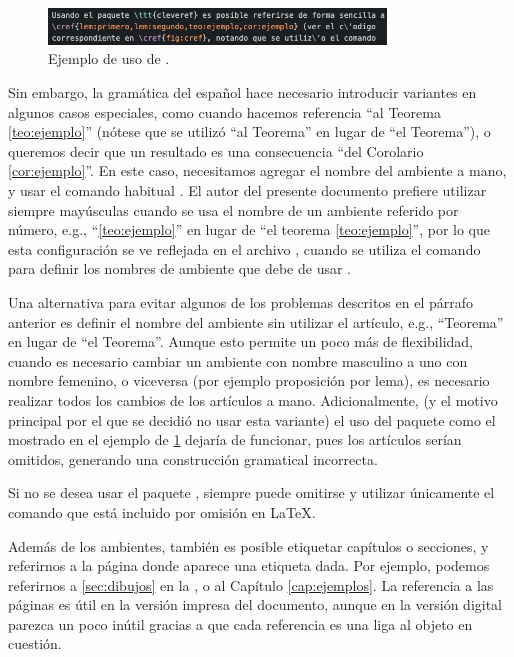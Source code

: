 \begin{figure}[H]
  \centering
  \includegraphics[width=0.8\textwidth]{recursos/capturas/cref}
  \caption{Ejemplo de uso de .}
  \label{fig:cref}
\end{figure}

Sin embargo, la gram\'atica del espa\~nol hace necesario introducir variantes en
algunos casos especiales, como cuando hacemos referencia ``al Teorema
\ref{teo:ejemplo}'' (n\'otese que se utiliz\'o ``al Teorema'' en lugar de ``el
Teorema''), o queremos decir que un resultado es una consecuencia ``del
Corolario \ref{cor:ejemplo}''.   En este caso, necesitamos agregar el nombre del
ambiente a mano, y usar el comando habitual .   El
autor del presente documento prefiere utilizar siempre may\'usculas cuando se
usa el nombre de un ambiente referido por n\'umero, e.g., ``\cref{teo:ejemplo}''
en lugar de ``el teorema \ref{teo:ejemplo}'', por lo que esta configuraci\'on se
ve reflejada en el archivo , cuando se utiliza el comando
 para definir los nombres de ambiente que debe de
usar .

Una alternativa para evitar algunos de los problemas descritos en el p\'arrafo
anterior es definir el nombre del ambiente sin utilizar el art\'iculo, e.g.,
``Teorema'' en lugar de ``el Teorema''.   Aunque esto permite un poco m\'as de
flexibilidad, cuando es necesario cambiar un ambiente con nombre masculino a uno
con nombre femenino, o viceversa (por ejemplo proposici\'on por lema), es
necesario realizar todos los cambios de los art\'iculos a mano.  Adicionalmente,
(y el motivo principal por el que se decidi\'o no usar esta variante) el uso del
paquete como el mostrado en el ejemplo de \cref{fig:cref} dejar\'ia de
funcionar, pues los art\'iculos ser\'ian omitidos, generando una construcci\'on
gramatical incorrecta.

Si no se desea usar el paquete , siempre puede omitirse y utilizar
\'unicamente el comando  que est\'a incluido por
omisi\'on en \LaTeX.

Adem\'as de los ambientes, tambi\'en es posible etiquetar cap\'itulos o
secciones, y referirnos a la p\'agina donde aparece una etiqueta dada.   Por
ejemplo, podemos referirnos a \cref{sec:dibujos} en la , o
al Cap\'itulo \ref{cap:ejemplos}.   La referencia a las p\'aginas es \'util en
la versi\'on impresa del documento, aunque en la versi\'on digital parezca un
poco in\'util gracias a que cada referencia es una liga al objeto en cuesti\'on.



